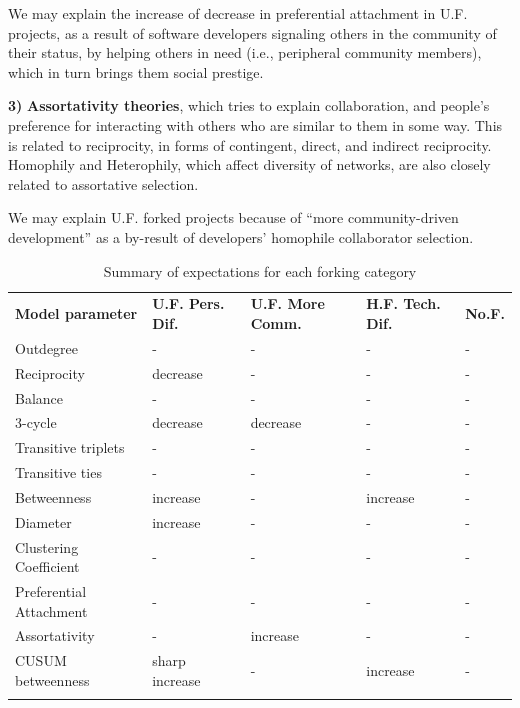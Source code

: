 \documentclass{acm_proc_article-sp}
\begin{document}
We may explain the increase of decrease in preferential attachment in U.F. projects, as a result of software developers signaling others in the community of their status, by helping others in need (i.e., peripheral community members), which in turn brings them social prestige.

\textbf{3)} \textbf{Assortativity theories}, which tries to explain collaboration, and people's preference for interacting with others who are similar to them in some way. This is related to reciprocity, in forms of contingent, direct, and indirect reciprocity. Homophily and Heterophily, which affect diversity of networks, are also closely related to assortative selection.

We may explain U.F. forked projects because of ``more community-driven development'' as a by-result of developers' homophile collaborator selection.


\begin{table} [!Ht]
\centering
\caption{Summary of expectations for each forking category}
\label{tabelSummaryExpectationModelParameters}       
\begin{tabular}{m{} m{} m{} m{} m{}}
\hline\noalign{\smallskip}
\textbf{Model parameter} & \textbf{U.F. Pers. Dif.} & \textbf{U.F. More Comm.} & \textbf{H.F. Tech. Dif.} & \textbf{No.F.}\\
\noalign{\smallskip}\hline\noalign{\smallskip}
Outdegree & - & - & - & - \\ \hline
Reciprocity & decrease & - & - & - \\ \hline
Balance & - & - & - & - \\ \hline
3-cycle & decrease & decrease & - & - \\ \hline
Transitive triplets & - & - & - & - \\ \hline
Transitive ties & - & - & - & - \\ \hline
Betweenness & increase & - & increase & - \\ \hline
Diameter & increase & - & - & - \\ \hline
Clustering Coefficient & - & - & - & - \\ \hline
Preferential Attachment & - & - & - & - \\ \hline
Assortativity & - & increase & - & - \\ \hline
CUSUM betweenness & sharp increase & - & increase & - \\
\noalign{\smallskip}\hline
\end{tabular}
\end{table}
\end{document}
